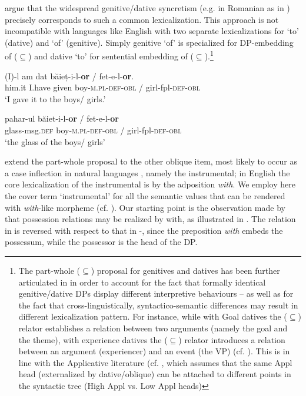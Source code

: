 \documentclass[output=paper,modfonts,nonflat,newtxmath,colorlinks,citecolor=brown]{langsci/langscibook}
\begin{document}
\citet{ManziniSavoia2011} argue that the widespread genitive/dative syncretism (e.g. in Romanian as in ) precisely corresponds to such a common lexicalization. This approach is not incompatible with languages like English with two separate lexicalizations for ‘to’ (dative) and ‘of’ (genitive). Simply genitive ‘of’ is specialized for DP-embedding of (${\subseteq}$) and dative ‘to’ for sentential embedding of (${\subseteq}$).\footnote{The part-whole (\textrm{${\subseteq}$}) proposal for genitives and datives has been further articulated in \citet{ManziniFranco2016, FrancoManzini2017Gen} in order to account for the fact that formally identical genitive/dative DPs display different interpretive behaviours – as well as for the fact that cross-linguistically, syntactico-semantic differences may result in different lexicalization pattern. For instance, while with Goal datives the (\textrm{${\subseteq}$}) relator establishes a relation between two arguments (namely the goal and the theme), with experience datives the (\textrm{${\subseteq}$}) relator introduces a relation between an argument (experiencer) and an event (the VP) (cf. \citealt[230--231]{ManziniFranco2016}). This is in line with the Applicative literature (cf. \citealt{Pylkkänen2008}, which assumes that the same Appl head (externalized by dative/oblique) can be attached to different points in the syntactic tree (High Appl {vs}. Low Appl heads)} 

\ea%
    \label{ex:franco:3}
    \ea
    \gll (I)-l am dat băieț-i-l-\textbf{or} / fet-e-l-\textbf{or}. \\
        him.it I.have given boy-\textsc{m.pl}-\textsc{def}-\textsc{obl} / girl-fpl-\textsc{def}-\textsc{obl}\\
    \glt ‘I gave it to the boys/ girls.’
    
     \ex
    \gll pahar-ul băiet-i-l-\textbf{or} / fet-e-l-\textbf{or} \\
        glass-msg.\textsc{def} boy-\textsc{m.pl}-\textsc{def}-\textsc{obl} / girl-fpl-\textsc{def}-\textsc{obl}\\
    \glt ‘the glass of the boys/ girls’ 
    \z
    \z


\citet{FrancoManzini2017Ins} extend the part-whole proposal to the other oblique item, most likely to occur as a case inflection in natural languages \citep{Caha2009}, namely the instrumental; in English the core lexicalization of the instrumental is by the adposition \textit{with}. We employ here the cover term ‘instrumental’ for all the semantic values that can be rendered with \textit{with}-like morpheme (cf. \citealt{StolzStrohUrdze2006}). Our starting point is the observation made by \citet{Levinson2011} that possession relations may be realized by {with}, as illustrated in . The relation in  is reversed with respect to that in -, since the preposition \textit{with} embeds the {possessum}, while the possessor is the head of the DP.
\end{document}
